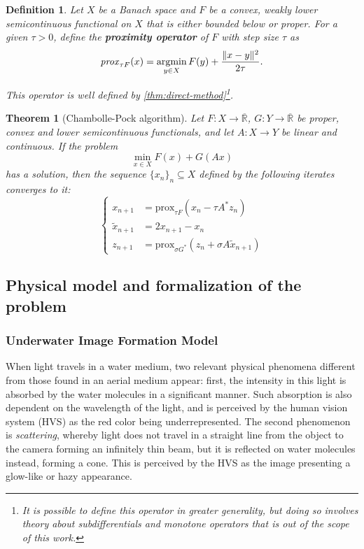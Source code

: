\documentclass[twocolumn,twoside,a4paper,10pt]{IEEEtran}
\newtheorem{definition}{Definition}
\newtheorem{theorem}{Theorem}
\DeclareMathOperator*{\argmin}{\operatorname*{argmin}}
\DeclareMathOperator*{\argmin}{arg\,min}
\begin{document}
\begin{definition}
  Let \(X\) be a Banach space and \(F\) be a convex, weakly lower semicontinuous functional on \(X\) that is either bounded below or proper. For a given \(\tau>0\), define the \textbf{proximity operator} of \(F\) with step size \(\tau\) as
  \[
    \text{\emph{prox}}_{\tau F}(x) = \argmin_{y\in X}F(y) + \frac{\|x-y\|^2}{2\tau}
  .\]

  This operator is well defined by \cref{thm:direct-method}\footnote{It is possible to define this operator in greater generality, but doing so involves theory about subdifferentials and monotone operators that is out of the scope of this work.}.
\end{definition}

\begin{theorem}[Chambolle-Pock algorithm]\label{thm:chambolle-pock}
  Let \(F\colon X\to\overline{\mathbb{R}}\), \(G\colon Y\to\overline{\mathbb{R}}\) be proper, convex and lower semicontinuous functionals, and let \(A\colon X\to Y\) be linear and continuous. If the problem
  \[
    \min_{x\in X}F(x) + G(Ax)
  \]
  has a solution, then the sequence \(\{x_n\}_n\subseteq X\) defined by the following iterates converges to it:
  \begin{equation}\label{eq:iterates}
    \left\{
    \begin{split}
      x_{n+1} & = \text{prox}_{\tau F}(x_n - \tau A^*z_n) \\
      \tilde{x}_{n+1} & = 2x_{n+1} - x_n \\
      z_{n+1} & = \text{prox}_{\sigma G^*}(z_n + \sigma A\tilde{x}_{n+1})
    \end{split}
    \right.
  \end{equation}
\end{theorem}

\subsection{Physical model and formalization of the problem} \label{subsec:physical-model}
\subsubsection{Underwater Image Formation Model}
When light travels in a water medium, two relevant physical phenomena different from those found in an aerial medium appear: first, the intensity in this light
is absorbed by the water molecules in a significant manner. Such absorption is
also dependent on the wavelength of the light, and is perceived by the human vision system (HVS) as the red color being underrepresented. The second phenomenon is
\textit{scattering}, whereby light does not travel in a straight line from the
object to the camera forming an infinitely thin beam, but it is reflected on water molecules instead, forming a cone. This is perceived by the HVS as the image
presenting a glow-like or hazy appearance.
\end{document}
